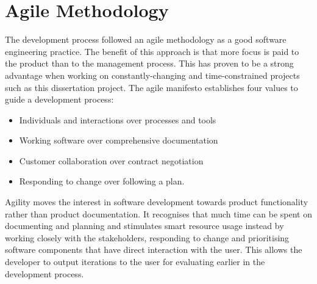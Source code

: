 \section{Agile Methodology}
The development process followed an agile methodology as a good software engineering practice. The benefit of this approach is that more focus is paid to the product than to the management process. This has proven to be a strong advantage when working on constantly-changing and time-constrained projects such as this dissertation project.
The agile manifesto \cite{Martin2002} establishes four values to guide a development process: 
\begin{displayquote}
\begin{itemize}
  \item Individuals and interactions over processes and tools
  \item Working software over comprehensive documentation
  \item Customer collaboration over contract negotiation
  \item Responding to change over following a plan. 
\end{itemize}
\end{displayquote}

Agility moves the interest in software development towards product functionality rather than product documentation. It recognises that much time can be spent on documenting and planning and stimulates smart resource usage instead by working closely with the stakeholders, responding to change and prioritising software components that have direct interaction with the user. This allows the developer to output iterations to the user for evaluating earlier in the development process.

\iffalse
\subsection{Self-management}
Versioning software was used to manage the workflow of the different components of the system, the repositories are available online in a public GitHub repository. Links
\fi